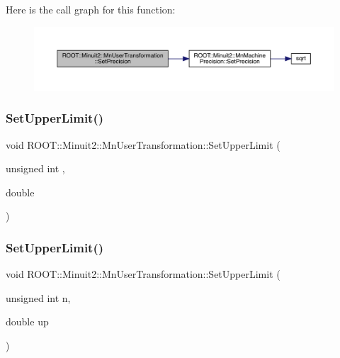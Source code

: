 Here is the call graph for this function\+:
\nopagebreak
\begin{figure}[H]
\begin{center}
\leavevmode
\includegraphics[width=350pt]{d9/d98/classROOT_1_1Minuit2_1_1MnUserTransformation_aa80f289974f19753a2912a8eb6311f53_cgraph}
\end{center}
\end{figure}
\mbox{\label{classROOT_1_1Minuit2_1_1MnUserTransformation_a276c83d584ef857cd2b69ecc04cfab01}} 
\subsubsection{\texorpdfstring{SetUpperLimit()}{SetUpperLimit()}\hspace{0.1cm}{\footnotesize\ttfamily [1/4]}}
{\footnotesize\ttfamily void R\+O\+O\+T\+::\+Minuit2\+::\+Mn\+User\+Transformation\+::\+Set\+Upper\+Limit (\begin{DoxyParamCaption}\item[{unsigned int}]{,  }\item[{double}]{ }\end{DoxyParamCaption})}

\mbox{\label{classROOT_1_1Minuit2_1_1MnUserTransformation_a276c83d584ef857cd2b69ecc04cfab01}} 
\subsubsection{\texorpdfstring{SetUpperLimit()}{SetUpperLimit()}\hspace{0.1cm}{\footnotesize\ttfamily [2/4]}}
{\footnotesize\ttfamily void R\+O\+O\+T\+::\+Minuit2\+::\+Mn\+User\+Transformation\+::\+Set\+Upper\+Limit (\begin{DoxyParamCaption}\item[{unsigned int}]{n,  }\item[{double}]{up }\end{DoxyParamCaption})}

